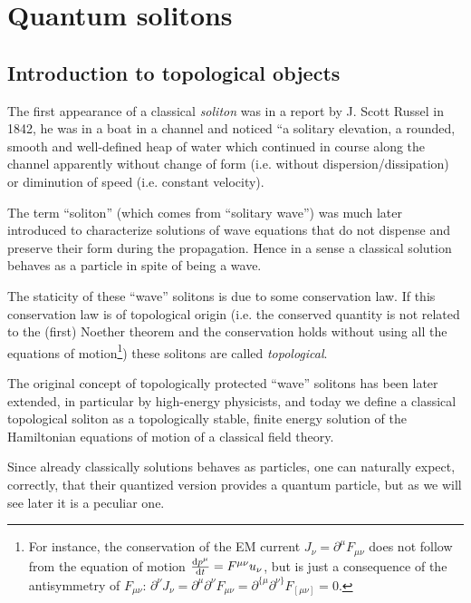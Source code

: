 \documentclass[../main/main.tex]{subfiles}
\begin{document}

\chapter{Quantum solitons}

\section{Introduction to topological objects}

The first appearance of a classical \emph{soliton} was in a report by J. Scott Russel in 1842, he was in a boat in a channel and noticed ``a solitary elevation, a rounded, smooth and well-defined heap of water which continued in course along the channel apparently without change of form (i.e. without dispersion/dissipation) or diminution of speed (i.e. constant velocity). 

The term ``soliton'' (which comes from ``solitary wave'') was much later introduced to characterize solutions of wave equations that do not dispense and preserve their form during the propagation. Hence in a sense a classical solution behaves as a particle in spite of being a wave. 

The staticity of these ``wave'' solitons is due to some conservation law. If this conservation law is of topological origin (i.e. the conserved quantity is not related to the (first) Noether theorem and the conservation holds without using all the equations of motion\footnote{For instance, the conservation of the EM current $J_\nu=\partial^\mu F_{\mu\nu}$ does not follow from the equation of motion $\frac{\textnormal{d} p^\mu}{\textnormal{d} t}=F^{\mu\nu}u_\nu$, but is just a consequence of the antisymmetry of $F_{\mu\nu}$: $\partial^\nu J_\nu=\partial^\mu\partial^\nu F_{\mu\nu}=\partial^{\{\mu}\partial^{\nu\}}F_{[\mu\nu]}=0$.}) these solitons are called \emph{topological}. 

The original concept of topologically protected ``wave'' solitons has been later extended, in particular by high-energy physicists, and today we define a classical topological soliton as a topologically stable, finite energy solution of the Hamiltonian equations of motion of a classical field theory. 

Since already classically solutions behaves as particles, one can naturally expect, correctly, that their quantized version provides a quantum particle, but as we will see later it is a peculiar one. 
\end{document}
